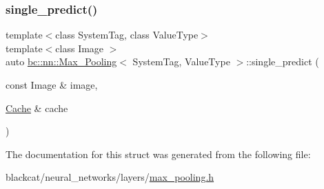 \subsubsection{\texorpdfstring{single\+\_\+predict()}{single\_predict()}}
{\footnotesize\ttfamily template$<$class System\+Tag, class Value\+Type$>$ \\
template$<$class Image $>$ \\
auto \hyperlink{structbc_1_1nn_1_1Max__Pooling}{bc\+::nn\+::\+Max\+\_\+\+Pooling}$<$ System\+Tag, Value\+Type $>$\+::single\+\_\+predict (\begin{DoxyParamCaption}\item[{const Image \&}]{image,  }\item[{\hyperlink{structbc_1_1nn_1_1Cache}{Cache} \&}]{cache }\end{DoxyParamCaption})\hspace{0.3cm}{\ttfamily [inline]}}



The documentation for this struct was generated from the following file\+:\begin{DoxyCompactItemize}
\item 
blackcat/neural\+\_\+networks/layers/\hyperlink{max__pooling_8h}{max\+\_\+pooling.\+h}\end{DoxyCompactItemize}
